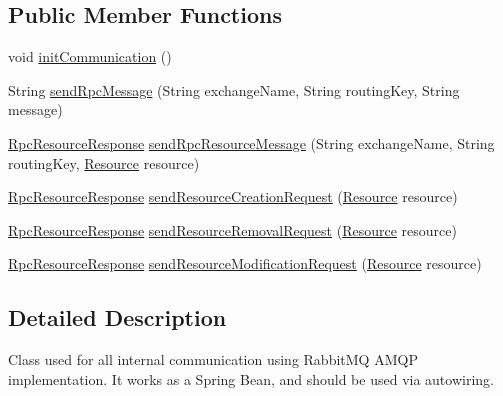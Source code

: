\subsection*{Public Member Functions}
\begin{DoxyCompactItemize}
\item 
void \hyperlink{classeu_1_1h2020_1_1symbiote_1_1communication_1_1RabbitManager_a30abf6a670122eb22a8105a206858616}{init\+Communication} ()
\item 
String \hyperlink{classeu_1_1h2020_1_1symbiote_1_1communication_1_1RabbitManager_a822ebbed01755311ca9038bb7fa43591}{send\+Rpc\+Message} (String exchange\+Name, String routing\+Key, String message)
\item 
\hyperlink{classeu_1_1h2020_1_1symbiote_1_1model_1_1RpcResourceResponse}{Rpc\+Resource\+Response} \hyperlink{classeu_1_1h2020_1_1symbiote_1_1communication_1_1RabbitManager_a6808181b7e4c15f2df78ce4fad849410}{send\+Rpc\+Resource\+Message} (String exchange\+Name, String routing\+Key, \hyperlink{classeu_1_1h2020_1_1symbiote_1_1model_1_1Resource}{Resource} resource)
\item 
\hyperlink{classeu_1_1h2020_1_1symbiote_1_1model_1_1RpcResourceResponse}{Rpc\+Resource\+Response} \hyperlink{classeu_1_1h2020_1_1symbiote_1_1communication_1_1RabbitManager_a08dd4eafe2acb4f63d1f91f5bb06e334}{send\+Resource\+Creation\+Request} (\hyperlink{classeu_1_1h2020_1_1symbiote_1_1model_1_1Resource}{Resource} resource)
\item 
\hyperlink{classeu_1_1h2020_1_1symbiote_1_1model_1_1RpcResourceResponse}{Rpc\+Resource\+Response} \hyperlink{classeu_1_1h2020_1_1symbiote_1_1communication_1_1RabbitManager_aaa73d52dd050020e7f639e19ec2d1c74}{send\+Resource\+Removal\+Request} (\hyperlink{classeu_1_1h2020_1_1symbiote_1_1model_1_1Resource}{Resource} resource)
\item 
\hyperlink{classeu_1_1h2020_1_1symbiote_1_1model_1_1RpcResourceResponse}{Rpc\+Resource\+Response} \hyperlink{classeu_1_1h2020_1_1symbiote_1_1communication_1_1RabbitManager_ac2d5ddaefda40d8c479857ca18f6a505}{send\+Resource\+Modification\+Request} (\hyperlink{classeu_1_1h2020_1_1symbiote_1_1model_1_1Resource}{Resource} resource)
\end{DoxyCompactItemize}


\subsection{Detailed Description}
Class used for all internal communication using Rabbit\+MQ A\+M\+QP implementation. It works as a Spring Bean, and should be used via autowiring. 

